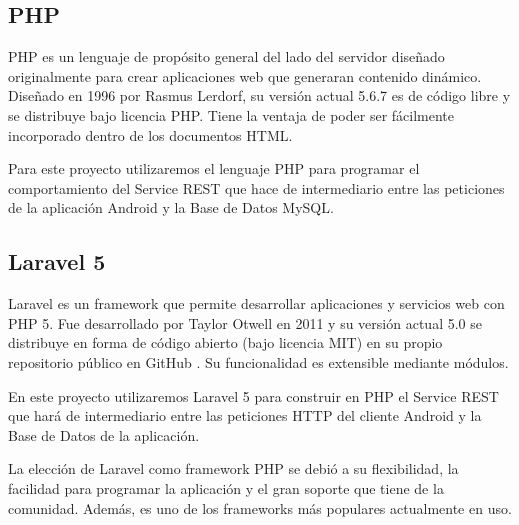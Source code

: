     \subsection{PHP}\label{ssec:php}
    
	PHP \cite{ref:php} es un lenguaje de propósito general del lado del servidor diseñado originalmente para crear aplicaciones web que generaran contenido dinámico. Diseñado en 1996 por Rasmus Lerdorf, su versión actual 5.6.7 es de código libre y se distribuye bajo licencia PHP. Tiene la ventaja de poder ser fácilmente incorporado dentro de los documentos HTML.
	
	Para este proyecto utilizaremos el lenguaje PHP para programar el comportamiento del Service REST que hace de intermediario entre las peticiones de la aplicación Android y la Base de Datos MySQL.
    
    \subsection{Laravel 5}\label{ssec:laravel}
    
	Laravel \cite{ref:laravel} es un framework que permite desarrollar aplicaciones y servicios web con PHP 5. Fue desarrollado por Taylor Otwell en 2011 y su versión actual 5.0 se distribuye en forma de código abierto (bajo licencia MIT) en su propio repositorio público en GitHub \cite{ref:laravel_github}. Su funcionalidad es extensible mediante módulos.
	
	En este proyecto utilizaremos Laravel 5 para construir en PHP el Service REST que hará de intermediario entre las peticiones HTTP del cliente Android y la Base de Datos de la aplicación.
	
	La elección de Laravel como framework PHP se debió a su flexibilidad, la facilidad para programar la aplicación y el gran soporte que tiene de la comunidad. Además, es uno de los frameworks más populares actualmente en uso.
	
